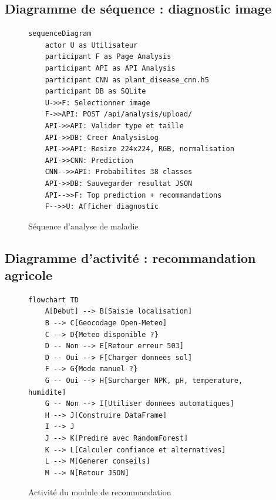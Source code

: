 \subsection{Diagramme de séquence : diagnostic image}
\begin{figure}[H]
\centering
\caption{Séquence d'analyse de maladie}
\begin{lstlisting}[language=mermaid]
sequenceDiagram
    actor U as Utilisateur
    participant F as Page Analysis
    participant API as API Analysis
    participant CNN as plant_disease_cnn.h5
    participant DB as SQLite
    U->>F: Selectionner image
    F->>API: POST /api/analysis/upload/
    API->>API: Valider type et taille
    API->>DB: Creer AnalysisLog
    API->>API: Resize 224x224, RGB, normalisation
    API->>CNN: Prediction
    CNN-->>API: Probabilites 38 classes
    API->>DB: Sauvegarder resultat JSON
    API-->>F: Top prediction + recommandations
    F-->>U: Afficher diagnostic
\end{lstlisting}
\end{figure}

\subsection{Diagramme d'activité : recommandation agricole}
\begin{figure}[H]
\centering
\caption{Activité du module de recommandation}
\begin{lstlisting}[language=mermaid]
flowchart TD
    A[Debut] --> B[Saisie localisation]
    B --> C[Geocodage Open-Meteo]
    C --> D{Meteo disponible ?}
    D -- Non --> E[Retour erreur 503]
    D -- Oui --> F[Charger donnees sol]
    F --> G{Mode manuel ?}
    G -- Oui --> H[Surcharger NPK, pH, temperature, humidite]
    G -- Non --> I[Utiliser donnees automatiques]
    H --> J[Construire DataFrame]
    I --> J
    J --> K[Predire avec RandomForest]
    K --> L[Calculer confiance et alternatives]
    L --> M[Generer conseils]
    M --> N[Retour JSON]
\end{lstlisting}
\end{figure}

